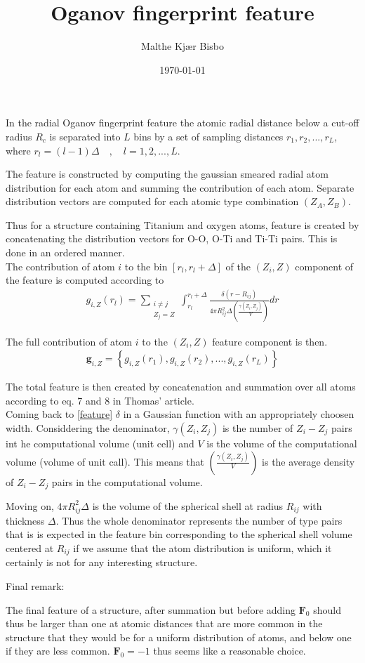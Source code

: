 \documentclass[english,a4paper,oneside, onecolumn,article,9pt]{memoir}
\title{Oganov fingerprint feature}
\author{Malthe Kjær Bisbo}
\date{\today}
\newcommand{\mb}[1]{\mathbf{#1}}
\begin{document}
\thispagestyle{empty}
\maketitle

In the radial Oganov fingerprint feature the atomic radial distance below a cut-off radius $R_c$ is separated into $L$ bins by a set of sampling distances ${r_1, r_2,...,r_L}$, where $r_l = (l-1)\Delta \quad, \quad l=1,2,...,L$.

The feature is constructed by computing the gaussian smeared radial atom distribution for each atom and summing the contribution of each atom. Separate distribution vectors are computed for each atomic type combination $(Z_A, Z_B)$. 

Thus for a structure containing Titanium and oxygen atoms, feature is created by concatenating the distribution vectors for O-O, O-Ti and Ti-Ti pairs. This is done in an ordered manner. \\

The contribution of atom $i$ to the bin $[r_l, r_l+\Delta]$ of the $(Z_i, Z)$ component of the feature is computed according to 
\begin{align}
g_{i,Z}(r_l) = \sum_{\substack{i\neq j \\ Z_j=Z}}\int_{r_l}^{r_l+\Delta} \frac{\delta(r-R_{ij})}{4\pi R_{ij}^2\Delta \left(\frac{\gamma(Z_i,Z_j)}{V}\right)}dr
\label{feature}
\end{align}

The full contribution of atom $i$ to the $(Z_i, Z)$ feature component is then.
\begin{align}
\mb{g}_{i,Z} = \left\{g_{i,Z}(r_1), g_{i,Z}(r_2), ... , g_{i,Z}(r_L)\right\}
\end{align}

The total feature is then created by concatenation and summation over all atoms according to eq. 7 and 8 in Thomas' article. \\

Coming back to \ref{feature} $\delta$ in a Gaussian function with an appropriately choosen width. Considdering the denominator, $\gamma(Z_i,Z_j)$ is the number of $Z_i-Z_j$ pairs int he computational volume (unit cell) and $V$ is the volume of the computational volume (volume of unit call). This means that $\left(\frac{\gamma(Z_i,Z_j)}{V}\right)$ is the average density of $Z_i-Z_j$ pairs in the computational volume.

Moving on,  $4\pi R_{ij}^2\Delta$ is the volume of the spherical shell at radius $R_{ij}$ with thickness $\Delta$. Thus the whole denominator represents the number of type pairs that is is expected in the feature bin corresponding to the spherical shell volume centered at $R_{ij}$ if we assume that the atom distribution is uniform, which it certainly is not for any interesting structure.

Final remark:

The final feature of a structure, after summation but before adding $\mb{F}_0$ should thus be larger than one at atomic distances that are more common in the structure that they would be for a uniform distribution of atoms, and below one if they are less common.
$\mb{F}_0 = -1$ thus seems like a reasonable choice.
\end{document}

